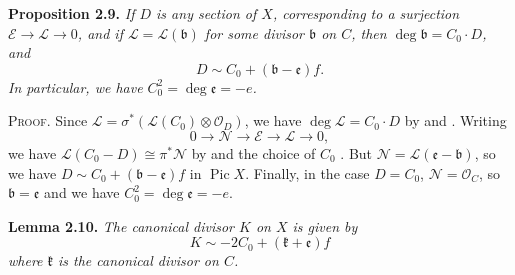 {\medskip
\noindent\hypertarget{result-V-2.9}{}\textbf{Proposition 2.9.} \emph{If $D$ is any section of $X$, corresponding to a surjection $\mathcal E\to\mathcal L\to0$, and if $\mathcal L=\mathcal L(\mathfrak b)$ for some divisor $\mathfrak b$ on $C$, then $\deg\mathfrak b=C_0\cdot D$, and}
\[
D\sim C_0+(\mathfrak b-\mathfrak e)f.
\]
\emph{In particular, we have $C_0^2=\deg\mathfrak e=-e$.}

\smallskip
\noindent\textsc{Proof.} Since $\mathcal L=\sigma^*(\mathcal L(C_0)\otimes\mathcal O_D)$, we have $\deg\mathcal L=C_0\cdot D$ by  and . Writing
\[
0\to\mathcal N\to\mathcal E\to\mathcal L\to0,
\]
we have $\mathcal L(C_0-D)\cong\pi^*\mathcal N$ by  and the choice of $C_0$ . But $\mathcal N=\mathcal L(\mathfrak e-\mathfrak b)$, so we have $D\sim C_0+(\mathfrak b-\mathfrak e)f$ in $\operatorname{Pic}X$. Finally, in the case $D=C_0$, $\mathcal N=\mathcal O_C$, so $\mathfrak b=\mathfrak e$ and we have $C_0^2=\deg\mathfrak e=-e$.

\medskip
\noindent\hypertarget{result-V-2.10}{}\textbf{Lemma 2.10.} \emph{The canonical divisor $K$ on $X$ is given by}
\[
K\sim-2C_0+(\mathfrak k+\mathfrak e)f
\]
\emph{where $\mathfrak k$ is the canonical divisor on $C$.}
}
